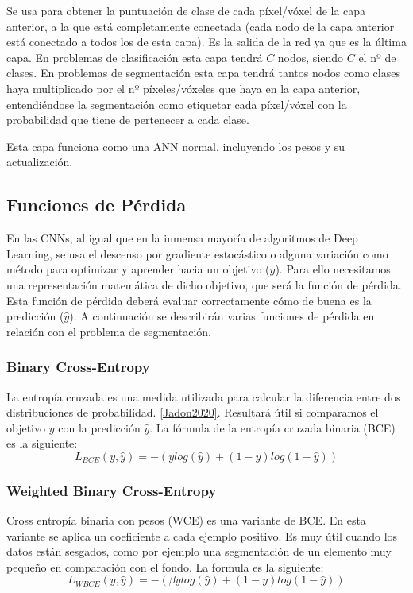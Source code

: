Se usa para obtener la puntuación de clase de cada píxel/vóxel de la capa anterior, a la que está completamente conectada (cada nodo de la capa anterior está conectado a todos los de esta capa). Es la salida de la red ya que es la última capa. En problemas de clasificación esta capa tendrá $C$ nodos, siendo $C$ el nº de clases. En problemas de segmentación esta capa tendrá tantos nodos como clases haya multiplicado por el nº píxeles/vóxeles que haya en la capa anterior, entendiéndose la segmentación como etiquetar cada píxel/vóxel con la probabilidad que tiene de pertenecer a cada clase.

Esta capa funciona como una ANN normal, incluyendo los pesos y su actualización.

\subsection{Funciones de Pérdida}

En las CNNs, al igual que en la inmensa mayoría de algoritmos de Deep Learning, se usa el descenso por gradiente estocástico o alguna variación como método para optimizar y aprender hacia un objetivo ($y$). Para ello necesitamos una representación matemática de dicho objetivo, que será la función de pérdida. Esta función de pérdida deberá evaluar correctamente cómo de buena es la predicción ($\hat{y}$). A continuación se describirán varias funciones de pérdida en relación con el problema de segmentación.

\subsubsection{Binary Cross-Entropy}

La entropía cruzada es una medida utilizada para calcular la diferencia entre dos distribuciones de probabilidad. \ref{Jadon2020}. Resultará útil si comparamos el objetivo $y$ con la predicción $\hat{y}$. La fórmula de la entropía cruzada binaria (BCE) es la siguiente:
\begin{equation}
L_{BCE}(y,\hat{y})=-(y log(\hat{y}) + (1-y)log(1-\hat{y}))
\end{equation}

\subsubsection{Weighted Binary Cross-Entropy}

Cross entropía binaria con pesos (WCE) es una variante de BCE. En esta variante se aplica un coeficiente a cada ejemplo positivo. Es muy útil cuando los datos están sesgados, como por ejemplo una segmentación de un elemento muy pequeño en comparación con el fondo. La formula es la siguiente:
\begin{equation}
L_{WBCE}(y,\hat{y})=-(\beta y log(\hat{y}) + (1-y)log(1-\hat{y}))
\end{equation}

